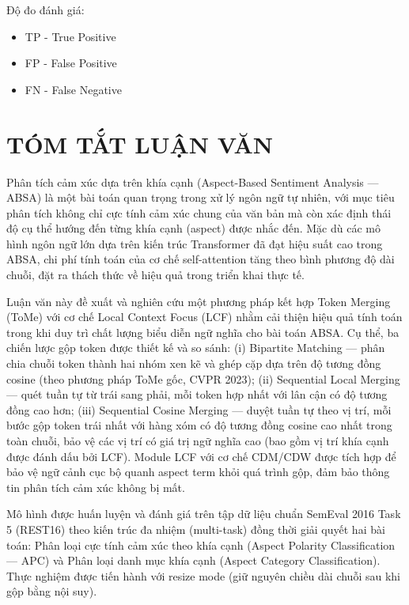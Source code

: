 ﻿\documentclass[14pt]{extreport}
\begin{document}
Độ đo đánh giá:
\begin{itemize}
    \item TP - True Positive
    \item FP - False Positive
    \item FN - False Negative
\end{itemize}

\newpage
\listoftables
{}

\newpage
\listoffigures
{}

\chapter*{TÓM TẮT LUẬN VĂN}
Phân tích cảm xúc dựa trên khía cạnh (Aspect-Based Sentiment Analysis — ABSA) là một bài toán quan trọng trong xử lý ngôn ngữ tự nhiên, với mục tiêu phân tích không chỉ cực tính cảm xúc chung của văn bản mà còn xác định thái độ cụ thể hướng đến từng khía cạnh (aspect) được nhắc đến. Mặc dù các mô hình ngôn ngữ lớn dựa trên kiến trúc Transformer đã đạt hiệu suất cao trong ABSA, chi phí tính toán của cơ chế self-attention tăng theo bình phương độ dài chuỗi, đặt ra thách thức về hiệu quả trong triển khai thực tế.

Luận văn này đề xuất và nghiên cứu một phương pháp kết hợp Token Merging (ToMe) với cơ chế Local Context Focus (LCF) nhằm cải thiện hiệu quả tính toán trong khi duy trì chất lượng biểu diễn ngữ nghĩa cho bài toán ABSA. Cụ thể, ba chiến lược gộp token được thiết kế và so sánh: (i) Bipartite Matching — phân chia chuỗi token thành hai nhóm xen kẽ và ghép cặp dựa trên độ tương đồng cosine (theo phương pháp ToMe gốc, CVPR 2023); (ii) Sequential Local Merging — quét tuần tự từ trái sang phải, mỗi token hợp nhất với lân cận có độ tương đồng cao hơn; (iii) Sequential Cosine Merging — duyệt tuần tự theo vị trí, mỗi bước gộp token trái nhất với hàng xóm có độ tương đồng cosine cao nhất trong toàn chuỗi, bảo vệ các vị trí có giá trị ngữ nghĩa cao (bao gồm vị trí khía cạnh được đánh dấu bởi LCF). Module LCF với cơ chế CDM/CDW được tích hợp để bảo vệ ngữ cảnh cục bộ quanh aspect term khỏi quá trình gộp, đảm bảo thông tin phân tích cảm xúc không bị mất.

Mô hình được huấn luyện và đánh giá trên tập dữ liệu chuẩn SemEval 2016 Task 5 (REST16) theo kiến trúc đa nhiệm (multi-task) đồng thời giải quyết hai bài toán: Phân loại cực tính cảm xúc theo khía cạnh (Aspect Polarity Classification — APC) và Phân loại danh mục khía cạnh (Aspect Category Classification). Thực nghiệm được tiến hành với resize mode (giữ nguyên chiều dài chuỗi sau khi gộp bằng nội suy).
\end{document}
